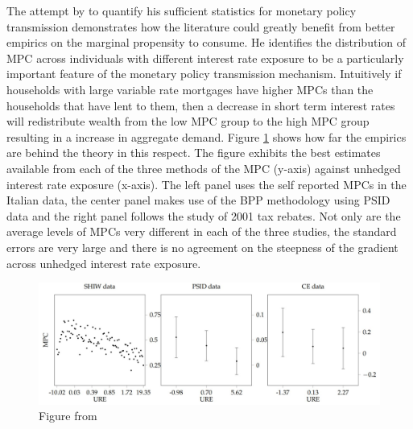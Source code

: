 \documentclass[titlepage]{\econtex}\newcommand{\texname}{IncomeUncertainty}
\begin{document}
The attempt by \cite{auclert_monetary_2015} to quantify his sufficient statistics for monetary policy transmission demonstrates how the literature could greatly benefit from better empirics on the marginal propensity to consume. He identifies the distribution of MPC across individuals with different interest rate exposure to be a particularly important feature of the monetary policy transmission mechanism. Intuitively if households with large variable rate mortgages have higher MPCs than the households that have lent to them, then a decrease in short term interest rates will redistribute wealth from the low MPC group to the high MPC group resulting in a increase in aggregate demand. Figure \ref{fig:Auclert} shows how far the empirics are behind the theory in this respect. The figure exhibits the best estimates available from each of the three methods of the MPC (y-axis) against unhedged interest rate exposure (x-axis). The left panel uses the self reported MPCs in the Italian data, the center panel makes use of the BPP methodology using PSID data and the right panel follows the \cite{johnson_household_2006} study of 2001 tax rebates. Not only are the average levels of MPCs very different in each of the three studies, the standard errors are very large and there is no agreement on the steepness of the gradient across unhedged interest rate exposure.
	\begin{figure} 
	\begin{centering}
	\includegraphics[scale=0.7]{Figures/MPCDistributionAuclert.jpg}
	\caption{Figure from \cite{auclert_monetary_2015}}
	\label{fig:Auclert}
	\end{centering}
	\end{figure}
\end{document}
